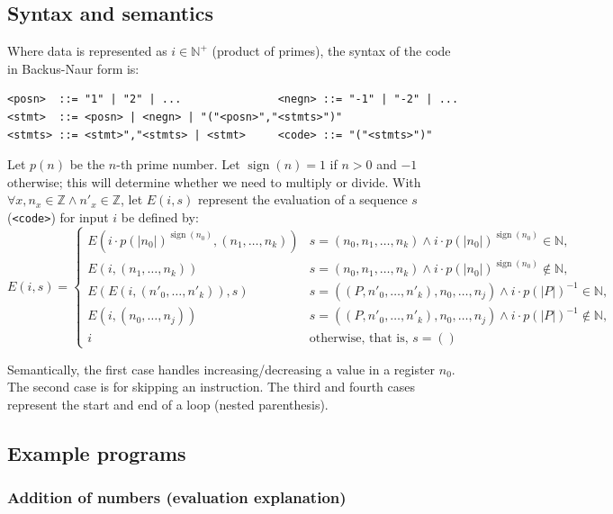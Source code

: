 \documentclass{article}
\DeclareMathOperator{\sign}{sign}
\begin{document}
\subsection{Syntax and semantics}

Where data is represented as $i \in \mathbb{N^+}$ (product of primes), the syntax of the code in Backus-Naur form\cite{b4} is:

\begin{verbatim}
<posn>  ::= "1" | "2" | ...               <negn> ::= "-1" | "-2" | ...
<stmt>  ::= <posn> | <negn> | "("<posn>","<stmts>")"
<stmts> ::= <stmt>","<stmts> | <stmt>     <code> ::= "("<stmts>")"
\end{verbatim}

Let $p(n)$ be the $n$-th prime number. Let $\sign(n) = 1$ if $n>0$ and $-1$ otherwise; this will determine whether we need to multiply or divide. With $\forall x, n_x \in \mathbb{Z} \land n'_x \in \mathbb{Z}$, let $E(i, s)$ represent the evaluation of a sequence $s$ (\texttt{<code>}) for input $i$ be defined by:
$$ E(i, s) = {
\begin{cases}
E(i \cdot p(|n_0|)^{\sign(n_0)}, (n_1, \ldots, n_k)) & s = (n_0, n_1, \ldots, n_k) \land i \cdot p(|n_0|)^{\sign(n_0)} \in \mathbb{N}, \\
E(i, (n_1, \ldots, n_k)) & s = (n_0, n_1, \ldots, n_k) \land i \cdot p(|n_0|)^{\sign(n_0)} \notin \mathbb{N}, \\
E(E(i, (n'_0, \ldots, n'_k)), s) & s = ((P, n'_0, \ldots, n'_k), n_0, \ldots, n_j) \land i \cdot p(|P|)^{-1} \in \mathbb{N}, \\
E(i, (n_0, \ldots, n_j)) & s = ((P, n'_0, \ldots, n'_k), n_0, \ldots, n_j) \land i \cdot p(|P|)^{-1} \notin \mathbb{N}, \\
i & {\text{otherwise, that is, } s = ()}\end{cases}} $$

Semantically, the first case handles increasing/decreasing a value in a register $n_0$. The second case is for skipping an instruction. The third and fourth cases represent the start and end of a loop (nested parenthesis).

\subsection{Example programs}

\subsubsection{Addition of numbers (evaluation explanation)}
\end{document}
